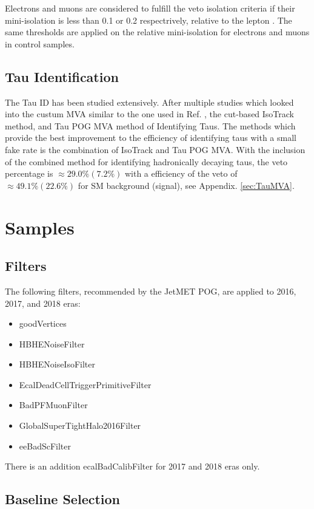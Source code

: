  Electrons and muons are considered to fulfill the veto isolation criteria if their mini-isolation is less than 0.1 or 0.2 respectrively, relative to the lepton \pt. The same thresholds are applied on the relative mini-isolation for electrons and muons in control samples. 
 
\subsection{Tau Identification}\label{TauID}
The Tau ID has been studied extensively. After multiple studies which looked into the custum MVA \cite{roe_boosted_2004, hoecker_tmva_2007} similar to the one used in Ref. \cite{noauthor_search_nodate}, the cut-based IsoTrack method, and Tau POG MVA method of Identifying Taus. The methods which provide the best improvement to the efficiency of identifying taus with a small fake rate is the combination of IsoTrack and Tau POG MVA. With the inclusion of the combined method for identifying hadronically decaying taus, the veto percentage is $\approx29.0\%(7.2\%)$ with a efficiency of the veto of $\approx49.1\%(22.6\%)$ for SM background (signal), see Appendix. \ref{sec:TauMVA}. 

\section{Samples}\label{Samples}



\subsection{Filters}
The following filters, recommended by the JetMET POG, are applied to 2016, 2017, and 2018 eras:
\begin{itemize}
	\item goodVertices
	\item HBHENoiseFilter
	\item HBHENoiseIsoFilter
	\item EcalDeadCellTriggerPrimitiveFilter
	\item BadPFMuonFilter
	\item GlobalSuperTightHalo2016Filter
	\item eeBadScFilter
\end{itemize}
There is an addition ecalBadCalibFilter for 2017 and 2018 eras only.

\subsection{Baseline Selection} \label{Baseline}

